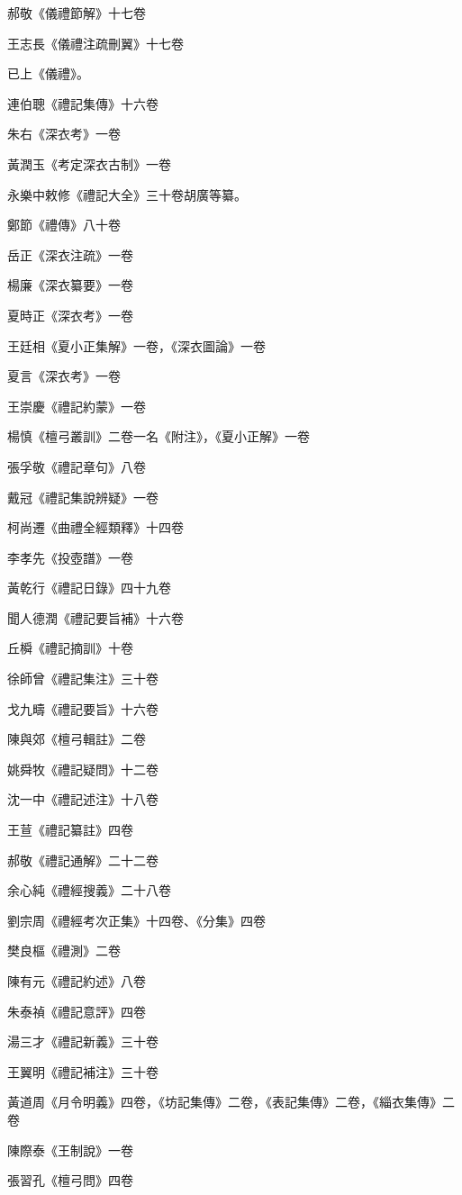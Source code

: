 郝敬《儀禮節解》十七卷

王志長《儀禮注疏刪翼》十七卷

已上《儀禮》。

連伯聰《禮記集傳》十六卷

朱右《深衣考》一卷

黃潤玉《考定深衣古制》一卷

永樂中敕修《禮記大全》三十卷胡廣等纂。

鄭節《禮傳》八十卷

岳正《深衣注疏》一卷

楊廉《深衣纂要》一卷

夏時正《深衣考》一卷

王廷相《夏小正集解》一卷，《深衣圖論》一卷

夏言《深衣考》一卷

王崇慶《禮記約蒙》一卷

楊慎《檀弓叢訓》二卷一名《附注》，《夏小正解》一卷

張孚敬《禮記章句》八卷

戴冠《禮記集說辨疑》一卷

柯尚遷《曲禮全經類釋》十四卷

李孝先《投壺譜》一卷

黃乾行《禮記日錄》四十九卷

聞人德潤《禮記要旨補》十六卷

丘橓《禮記摘訓》十卷

徐師曾《禮記集注》三十卷

戈九疇《禮記要旨》十六卷

陳與郊《檀弓輯註》二卷

姚舜牧《禮記疑問》十二卷

沈一中《禮記述注》十八卷

王荁《禮記纂註》四卷

郝敬《禮記通解》二十二卷

余心純《禮經搜義》二十八卷

劉宗周《禮經考次正集》十四卷、《分集》四卷

樊良樞《禮測》二卷

陳有元《禮記約述》八卷

朱泰禎《禮記意評》四卷

湯三才《禮記新義》三十卷

王翼明《禮記補注》三十卷

黃道周《月令明義》四卷，《坊記集傳》二卷，《表記集傳》二卷，《緇衣集傳》二卷

陳際泰《王制說》一卷

張習孔《檀弓問》四卷

